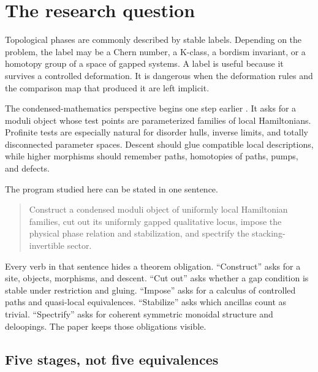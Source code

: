 \documentclass[12pt]{article}
\theoremstyle{definition}
\theoremstyle{remark}
\begin{document}
\begin{abstract}
The result is a precise conditional assembly theorem, a claim-status ledger,
and an executable Haskell validator that rejects the principal false
inferences.  It does not claim a completed condensed spectrum or a universal
classification of topological matter.
\end{abstract}

\tableofcontents

\section{The research question}

Topological phases are commonly described by stable labels.  Depending on
the problem, the label may be a Chern number, a K-class, a bordism invariant,
or a homotopy group of a space of gapped systems.  A label is useful because
it survives a controlled deformation.  It is dangerous when the deformation
rules and the comparison map that produced it are left implicit.

The condensed-mathematics perspective begins one step earlier
\cite{Scholze2026}.  It asks for
a moduli object whose test points are parameterized families of local
Hamiltonians.  Profinite tests are especially natural for disorder hulls,
inverse limits, and totally disconnected parameter spaces.  Descent should
glue compatible local descriptions, while higher morphisms should remember
paths, homotopies of paths, pumps, and defects.

The program studied here can be stated in one sentence.

\begin{quote}
Construct a condensed moduli object of uniformly local Hamiltonian families,
cut out its uniformly gapped qualitative locus, impose the physical phase
relation and stabilization, and spectrify the stacking-invertible sector.
\end{quote}

Every verb in that sentence hides a theorem obligation.  ``Construct'' asks
for a site, objects, morphisms, and descent.  ``Cut out'' asks whether a gap
condition is stable under restriction and gluing.  ``Impose'' asks for a
calculus of controlled paths and quasi-local equivalences.  ``Stabilize''
asks which ancillas count as trivial.  ``Spectrify'' asks for coherent
symmetric monoidal structure and deloopings.  The paper keeps those
obligations visible.

\subsection{Five stages, not five equivalences}
\end{document}
